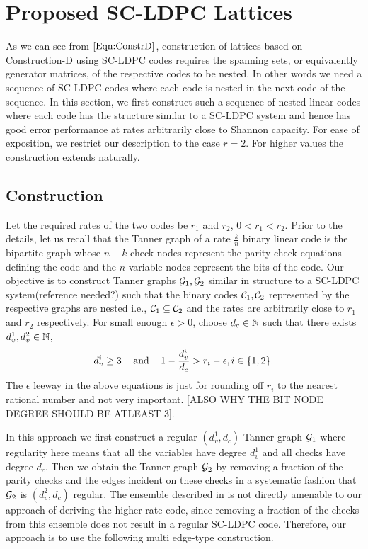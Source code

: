\documentclass[journal,twocolumn]{IEEEtran}
\begin{document}
\section{Proposed SC-LDPC Lattices}\label{Sec:SCLDPC}
As we can see from $\eqref{Eqn:ConstrD}$, construction of lattices based on Construction-D using SC-LDPC codes requires the spanning sets, or equivalently generator matrices, of the respective codes to be nested. In other words we need a sequence of SC-LDPC codes where each code is nested in the next code of the sequence. In this section, we first construct such a sequence of nested linear codes where each code has the structure similar to a SC-LDPC system and hence has good error performance at rates arbitrarily close to Shannon capacity. For ease of exposition, we restrict our description to the case $r=2$. For higher values the construction extends naturally.

\subsection{Construction}
Let the required rates of the two codes be $r_{1}$ and $r_{2}$, $0< r_{1}<r_{2}$. Prior to the details, let us recall that the Tanner graph of a rate $\frac{k}{n}$ binary linear code is the bipartite graph whose $n-k$ check nodes represent the parity check equations defining the code and the $n$ variable nodes represent the bits of the code. Our objective is to construct Tanner graphs $\mathcal{G}_{1},\mathcal{G}_{2}$ similar in structure to a SC-LDPC system(reference needed?) such that the binary codes $\mathcal{C}_{1},\mathcal{C}_{2}$ represented by the respective graphs are nested i.e., $\mathcal{C}_{1}\subseteq \mathcal{C}_{2}$ and the rates are arbitrarily close to $r_{1}$ and $r_{2}$ respectively. For small enough $\epsilon >0$, choose $d_{c}\in\mathbb{N}$ such that there exists $d_{v}^{1},d_{v}^{2}\in \mathbb{N}$,
\begin{align}
	d_{v}^{i}\geq 3 \hspace{0.3cm} \text{  and }  \hspace{0.3cm}  1-\frac{d_{v}^{i}}{d_{c}}>r_{i}-\epsilon, i\in \{1,2\}.
						\label{Eqn:DegreeConditions1}
\end{align}
The $\epsilon$ leeway in the above equations is just for rounding off $r_{i}$ to the nearest rational number and not very important. [ALSO WHY THE BIT NODE DEGREE SHOULD BE ATLEAST 3].

In this approach we first construct a regular $(d_{v}^{1},d_{c})$ Tanner graph $\mathcal{G}_{1}$ where regularity here means that all the variables have degree $d_{v}^{1}$ and all checks have degree $d_{c}$. Then we obtain the Tanner graph $\mathcal{G}_{2}$ by removing a fraction of the parity checks and the edges incident on these checks in a systematic fashion that $\mathcal{G}_{2}$ is $(d_{v}^{2},d_{c})$ regular. The ensemble described in \cite{KudekarUrbanke11} is not directly amenable to our approach of deriving the higher rate code, since removing a fraction of the checks from this ensemble does not result in a regular SC-LDPC code. Therefore, our approach is to use the following multi edge-type construction.
\end{document}
